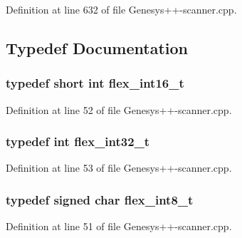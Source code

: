 Definition at line 632 of file Genesys++-\/scanner.\-cpp.



\subsection{Typedef Documentation}
\hypertarget{_genesys_09_09-scanner_8cpp_a2e73b2c75126814585525fb2e9d51159}{
\subsubsection[{flex\-\_\-int16\-\_\-t}]{\setlength{\rightskip}{0pt plus 5cm}typedef short int {\bf flex\-\_\-int16\-\_\-t}}}\label{_genesys_09_09-scanner_8cpp_a2e73b2c75126814585525fb2e9d51159}


Definition at line 52 of file Genesys++-\/scanner.\-cpp.

\hypertarget{_genesys_09_09-scanner_8cpp_a838ce943cf44ef7769480714fc6c3ba9}{
\subsubsection[{flex\-\_\-int32\-\_\-t}]{\setlength{\rightskip}{0pt plus 5cm}typedef int {\bf flex\-\_\-int32\-\_\-t}}}\label{_genesys_09_09-scanner_8cpp_a838ce943cf44ef7769480714fc6c3ba9}


Definition at line 53 of file Genesys++-\/scanner.\-cpp.

\hypertarget{_genesys_09_09-scanner_8cpp_a7b0840dff4a2ef1702118aa12264b2a7}{
\subsubsection[{flex\-\_\-int8\-\_\-t}]{\setlength{\rightskip}{0pt plus 5cm}typedef signed char {\bf flex\-\_\-int8\-\_\-t}}}\label{_genesys_09_09-scanner_8cpp_a7b0840dff4a2ef1702118aa12264b2a7}


Definition at line 51 of file Genesys++-\/scanner.\-cpp.

